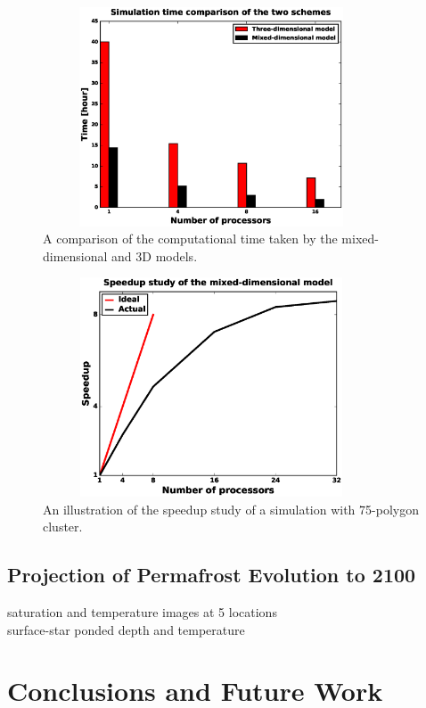 \documentclass[review]{elsarticle}
\begin{document}
\begin{figure}[!htpb]
\centering
\includegraphics[height = 6.5cm, width=10cm]{figures/compare3d-lcs-speed.eps}
\caption{A comparison of the computational time taken by the mixed-dimensional and 3D models.}
\label{3d-lcs-speed}
\end{figure}


\begin{figure}[!htpb]
\centering
\includegraphics[height = 6.5cm, width=10cm]{figures/speedup-lcs.eps}
\caption{An illustration of the speedup study of a simulation with 75-polygon cluster.}
\label{lcs-speed}
\end{figure}

\subsection{Projection of Permafrost Evolution to 2100}
saturation and temperature images at 5 locations \\
surface-star ponded depth and temperature

\section{Conclusions and Future Work}\label{conclusion}
\end{document}
